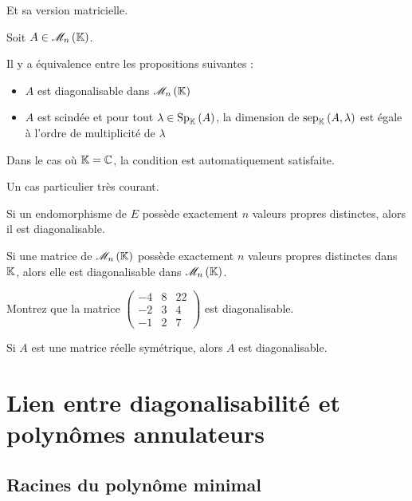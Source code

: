 Et sa version matricielle.

\begin{theo}
Soit \(A\in\M{n}\).

Il y a équivalence entre les propositions suivantes :

\begin{itemize}
    \item \(A\) est diagonalisable dans \(\M{n}\) \\
    \item \(A\) est scindée et pour tout \(\lambda\in\Sp[\K]{A}\), la dimension de \(\sep[\K]{A}{\lambda}\) est égale à l'ordre de multiplicité de \(\lambda\)
\end{itemize}
\end{theo}

Dans le cas où \(\mathbb{K}=\mathbb{C}\), la condition  est automatiquement satisfaite.

Un cas particulier très courant.

\begin{prop}
Si un endomorphisme de \(E\) possède exactement \(n\) valeurs propres distinctes, alors il est diagonalisable.

Si une matrice de \(\M{n}\) possède exactement \(n\) valeurs propres distinctes dans \(\mathbb{K}\), alors elle est diagonalisable dans \(\M{n}\).
\end{prop}

\begin{exo}
Montrez que la matrice \(\begin{pmatrix}
-4 & 8 & 22 \\
-2 & 3 & 4 \\
-1 & 2 & 7
\end{pmatrix}\) est diagonalisable.
\end{exo}

\begin{theo}
Si \(A\) est une matrice réelle symétrique, alors \(A\) est diagonalisable.
\end{theo}

\begin{dem}
\end{dem}

\section{Lien entre diagonalisabilité et polynômes annulateurs}

\subsection{Racines du polynôme minimal}

